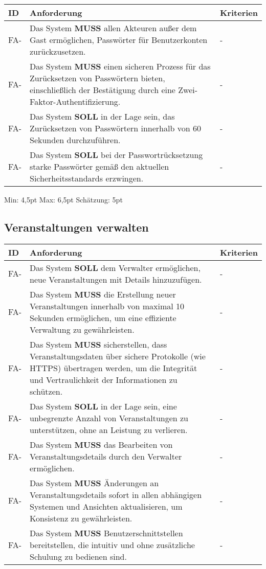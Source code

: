 \begin{tabular} {|p{}|p{11cm}|p{}|}
	\hline
	ID & Anforderung & Kriterien \\
	\hline
	FA-
	& Das System \textbf{MUSS} allen Akteuren außer dem Gast  ermöglichen, Passwörter für Benutzerkonten zurückzusetzen. 
	& - \\
	\hline
	FA-
	& Das System \textbf{MUSS} einen sicheren Prozess für das Zurücksetzen von Passwörtern bieten, einschließlich der Bestätigung durch eine Zwei-Faktor-Authentifizierung. 
	& - \\
	\hline
	FA-
	& Das System \textbf{SOLL} in der Lage sein, das Zurücksetzen von Passwörtern innerhalb von 60 Sekunden durchzuführen. 
	& - \\
	\hline
	FA-
	& Das System \textbf{SOLL} bei der Passwortrücksetzung starke Passwörter gemäß den aktuellen Sicherheitsstandards erzwingen. 
	& - \\
	\hline
\end{tabular}
Min: 4,5pt
Max: 6,5pt
Schätzung: 5pt

\vspace{18pt}

\subsection{Veranstaltungen verwalten}
\begin{tabular} {|p{}|p{11cm}|p{}|}
	\hline
	ID & Anforderung & Kriterien \\
	\hline
	FA-
	& Das System \textbf{SOLL} dem Verwalter ermöglichen, neue Veranstaltungen mit Details hinzuzufügen. 
	& - \\
	\hline
	FA-
	& Das System \textbf{MUSS} die Erstellung neuer Veranstaltungen innerhalb von maximal 10 Sekunden ermöglichen, um eine effiziente Verwaltung zu gewährleisten. 
	& - \\
	\hline
	FA-
	& Das System \textbf{MUSS} sicherstellen, dass Veranstaltungsdaten über sichere Protokolle (wie HTTPS) übertragen werden, um die Integrität und Vertraulichkeit der Informationen zu schützen. 
	& - \\
	\hline
	FA-
	& Das System \textbf{SOLL} in der Lage sein, eine unbegrenzte Anzahl von Veranstaltungen zu unterstützen, ohne an Leistung zu verlieren. 
	& - \\
	\hline
	FA-
	& Das System \textbf{MUSS} das Bearbeiten von Veranstaltungsdetails durch den Verwalter ermöglichen. 
	& - \\
	\hline
	FA-
	& Das System \textbf{MUSS} Änderungen an Veranstaltungsdetails sofort in allen abhängigen Systemen und Ansichten aktualisieren, um Konsistenz zu gewährleisten. 
	& - \\
	\hline
	FA-
	& Das System \textbf{MUSS} Benutzerschnittstellen bereitstellen, die intuitiv und ohne zusätzliche Schulung zu bedienen sind. 
	& - \\
	\hline
\end{tabular}

